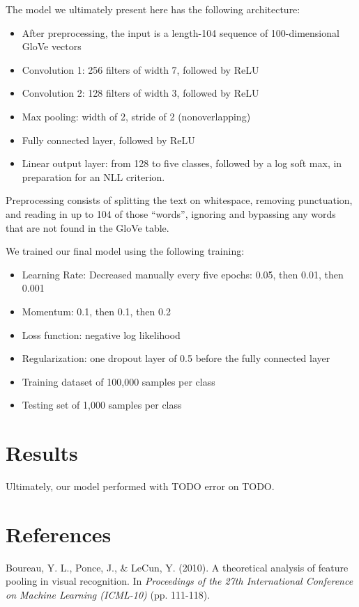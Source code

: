 \documentclass{article}
\begin{document}
The model we ultimately present here has the following architecture:

\begin{itemize}
\item After preprocessing, the input is a length-104 sequence of 100-dimensional GloVe vectors
\item Convolution 1: 256 filters of width 7, followed by ReLU
\item Convolution 2: 128 filters of width 3, followed by ReLU
\item Max pooling: width of 2, stride of 2 (nonoverlapping)
\item Fully connected layer, followed by ReLU
\item Linear output layer: from 128 to five classes, followed by a log soft max, in preparation for an NLL criterion.
\end{itemize}

Preprocessing consists of splitting the text on whitespace, removing punctuation, and reading in up to 104 of those ``words'', ignoring and bypassing any words that are not found in the GloVe table.

We trained our final model using the following training:
\begin{itemize}
\item Learning Rate: Decreased manually every five epochs: 0.05, then 0.01, then 0.001
\item Momentum: 0.1, then 0.1, then 0.2
\item Loss function: negative log likelihood
\item Regularization: one dropout layer of 0.5 before the fully connected layer
\item Training dataset of 100,000 samples per class
\item Testing set of 1,000 samples per class
\end{itemize}

\section*{Results}

Ultimately, our model performed with TODO error on TODO.

\section*{References}

Boureau, Y. L., Ponce, J., \& LeCun, Y. (2010). A theoretical analysis of feature pooling in visual recognition. In \emph{Proceedings of the 27th International Conference on Machine Learning (ICML-10)} (pp. 111-118).
\end{document}
